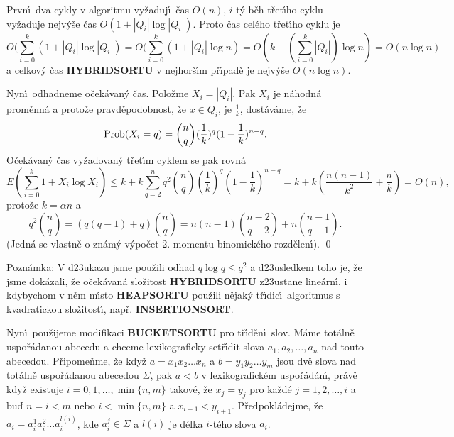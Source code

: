 \documentclass[a4paper,12pt]{article}
\begin{document}
Prvn\'\i\ dva cykly v algoritmu 
vy\v zaduj\'\i\ \v cas $O(n)$, $i$-t\'y b\v eh t\v ret\'\i ho cyklu vy\v zaduje 
nejv\'y\v se \v cas $O(1+|Q_i|\log|Q_i|)$. Proto \v cas cel\'eho t\v ret\'\i ho cyklu je 
$$O(\sum_{i=0}^k(1+|Q_i|\log|Q_i|)=O(\sum_{i=0}^k(1+|Q_i|\log n)=
O(k+(\sum_{i=0}^k|Q_i|)\log n)=O(n\log n)$$
a celkov\'y \v cas {\bf HYBRIDSORTU} v nejhor\v s\'\i m p\v r\'\i pad\v e je nejv\'y\v se $
O(n\log n)$.
\medskip

\flushpar Nyn\'\i\ odhadneme o\v cek\'avan\'y \v cas. Polo\v zme 
$X_i=|Q_i|$. Pak 
$X_i$ je n\'a\-hodn\'a prom\v enn\'a a 
proto\v ze pravd\v epodobnost, \v ze $x\in Q_i$, je $\frac 1k$, dost\'a\-v\'ame, \v ze 
$$\operatorname{Prob}(X_i=q)=\binom nq(\frac 1k)^q(1-\frac 1k)^{n-q}.$$
O\v cek\'avan\'y \v cas vy\v zadovan\'y t\v ret\'\i m cyklem se pak rovn\'a 
$$E(\sum_{i=0}^k1+X_i\log X_i)\le k+k\sum_{q=2}^nq^2\binom nq(\frac 
1k)^q(1-\frac 1k)^{n-q}=k+k(\frac {n(n-1)}{k^2}+\frac nk)=O(n),$$
proto\v ze $k=\alpha n$ a 
$$q^2\binom nq=(q(q-1)+q)\binom nq=n(n-1)\binom {n-2}{q-2}+n\binom {
n-1}{q-1}.$$
(Jedn\'a se vlastn\v e o zn\'am\'y v\'ypo\v cet 2. momentu 
binomick\'eho rozd\v elen\'\i ). \qed
\enddemo
\medskip

\flushpar Pozn\'amka: V d\accent23ukazu jsme pou\v zili odhad 
$q\log q\le q^2$ a d\accent23usledkem toho je, \v ze jsme 
dok\'azali, \v ze o\v cek\'avan\'a slo\v zitost {\bf HYBRIDSORTU }
z\accent23ustane line\'arn\'\i , i kdybychom v n\v em m\'\i sto 
{\bf HEAPSORTU} pou\v zili n\v ejak\'y t\v r\'\i dic\'\i\ algoritmus s 
kvadratickou slo\v zitost\'\i , nap\v r. {\bf INSERTIONSORT}.
\medskip

\flushpar Nyn\'\i\ pou\v zijeme modifikaci {\bf BUCKETSORTU} pro 
t\v r\'\i d\v en\'\i\ slov.  M\'ame tot\'aln\v e 
uspo\v r\'adanou abecedu a chceme lexikograficky set\v r\'\i dit slova 
$a_1,a_2,\dots,a_n$ nad touto abecedou. P\v ripo\-me\v n\-me, \v ze kdy\v z 
$a=x_1x_2\dots x_n$ a $b=y_1y_2\dots y_m$ jsou dv\v e slova nad tot\'aln\v e 
uspo\v r\'a\-danou abecedou $\Sigma$, pak $a<b$ v lexikografick\'em 
uspo\v r\'ad\'an\'\i , pr\'av\v e kdy\v z existuje $i=0,1,\dots,\min
\{n,m\}$ takov\'e, \v ze 
$x_j=y_j$  pro ka\v zd\'e $j=1,2,\dots,i$ a bu\v d $n=i<m$ nebo $
i<\min\{n,m\}$ 
a $x_{i+1}<y_{i+1}$. P\v redpokl\'adejme, \v ze $a_i=a_i^1a_i^2\dots 
a_i^{l(i)}$, kde 
$a_i^j\in\Sigma$ a $l(i)$ je d\'elka $i$-t\'eho slova $a_i$.
\bigskip
\end{document}
